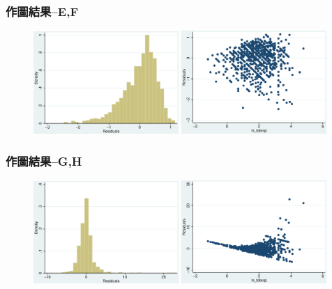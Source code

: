 \begin{frame}
    \frametitle{作圖結果--E,F}
    \begin{figure}
        \includegraphics[width = 0.49\textwidth]{../Results/Q4_11_hist_2.eps}
        \includegraphics[width = 0.49\textwidth]{../Results/Q4_11_scatter_2.eps}
    \end{figure}
\end{frame}
\begin{frame}
    \frametitle{作圖結果--G,H}
    \begin{figure}
        \includegraphics[width = 0.49\textwidth]{../Results/Q4_11_hist_3.eps}
        \includegraphics[width = 0.49\textwidth]{../Results/Q4_11_scatter_3.eps}
    \end{figure}
\end{frame}
